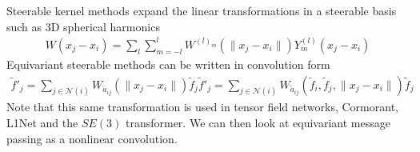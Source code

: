 \documentclass[book.tex]{subfiles}
\begin{document}
Steerable kernel methods expand the linear transformations in a steerable basis such as 3D spherical harmonics
\begin{align}
    W(x_j-x_i) = \sum_l\sum_{m=-l}^l W^{(l)_m}(\|x_j - x_i\|) Y^{(l)}_m(x_j - x_i)
\end{align}
Equivariant steerable methods can be written in convolution form
\begin{align}
    \tilde{f}'_j = \sum_{j \in \mathcal{N}(i)} W_{\tilde{a}_{ij}}(\|x_j - x_i\|)\tilde{f}_j
    \tilde{f}'_j = \sum_{j \in \mathcal{N}(i)} W_{\tilde{a}_{ij}}(\tilde{f}_i, \tilde{f}_j, \|x_j - x_i\|)\tilde{f}_j
\end{align}
Note that this same transformation is used in tensor field networks, Cormorant, L1Net \cite{miller2020relevance} and the $SE(3)$ transformer. We can then look at equivariant message passing as a nonlinear convolution. 













\end{document}
